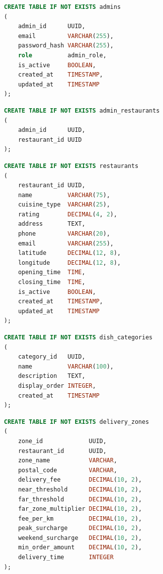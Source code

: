 \begin{lstlisting}[caption={Создание таблицы \code{admins}}, label={lst:sql_admins}, language=SQL]
CREATE TABLE IF NOT EXISTS admins
(
    admin_id      UUID,
    email         VARCHAR(255),
    password_hash VARCHAR(255),
    role          admin_role,
    is_active     BOOLEAN,
    created_at    TIMESTAMP,
    updated_at    TIMESTAMP
);
\end{lstlisting}

\begin{lstlisting}[caption={Создание таблицы \code{admin\_restaurants}}, label={lst:sql_admin_restaurants}, language=SQL]
CREATE TABLE IF NOT EXISTS admin_restaurants
(
    admin_id      UUID,
    restaurant_id UUID
);
\end{lstlisting}

\begin{lstlisting}[caption={Создание таблицы \code{restaurants}}, label={lst:sql_restaurants}, language=SQL]
CREATE TABLE IF NOT EXISTS restaurants
(
    restaurant_id UUID,
    name          VARCHAR(75),
    cuisine_type  VARCHAR(25),
    rating        DECIMAL(4, 2),
    address       TEXT,
    phone         VARCHAR(20),
    email         VARCHAR(255),
    latitude      DECIMAL(12, 8),
    longitude     DECIMAL(12, 8),
    opening_time  TIME,
    closing_time  TIME,
    is_active     BOOLEAN,
    created_at    TIMESTAMP,
    updated_at    TIMESTAMP
);
\end{lstlisting}

\begin{lstlisting}[caption={Создание таблицы \code{dish\_categories}}, label={lst:sql_dish_categories}, language=SQL]
CREATE TABLE IF NOT EXISTS dish_categories
(
    category_id   UUID,
    name          VARCHAR(100),
    description   TEXT,
    display_order INTEGER,
    created_at    TIMESTAMP
);
\end{lstlisting}

\begin{lstlisting}[caption={Создание таблицы \code{delivery\_zones}}, label={lst:sql_delivery_zones}, language=SQL]
CREATE TABLE IF NOT EXISTS delivery_zones
(
    zone_id             UUID,
    restaurant_id       UUID,
    zone_name           VARCHAR,
    postal_code         VARCHAR,
    delivery_fee        DECIMAL(10, 2),
    near_threshold      DECIMAL(10, 2),
    far_threshold       DECIMAL(10, 2),
    far_zone_multiplier DECIMAL(10, 2),
    fee_per_km          DECIMAL(10, 2),
    peak_surcharge      DECIMAL(10, 2),
    weekend_surcharge   DECIMAL(10, 2),
    min_order_amount    DECIMAL(10, 2),
    delivery_time       INTEGER
);
\end{lstlisting}

